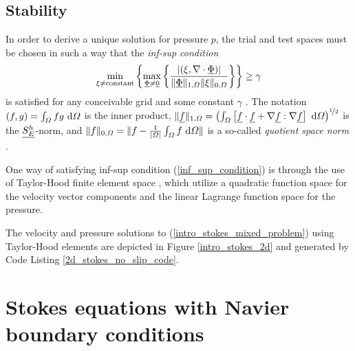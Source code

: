 \subsection{Stability}

In order to derive a unique solution for pressure $p$, the trial and test spaces must be chosen in such a way that the \emph{inf-sup condition}
\begin{align}
  \label{inf_sup_condition}
  \min_{\xi \neq \text{constant}} \left\{ \max_{\underline{\Phi} \neq \underline{0}} \left\{ \frac{\left| \left( \xi, \nabla \cdot \underline{\Phi} \right) \right|}{\Vert \underline{\Phi} \Vert_{1,\varOmega} \Vert \xi \Vert_{0,\varOmega} } \right\} \right\} \geq \gamma
\end{align}
is satisfied for any conceivable grid and some constant $\gamma$ \citep{elman_2005}.  The notation $(f,g) = \int_{\varOmega} f g \ \mathrm{d}\varOmega$ is the inner product, $\Vert \underline{f} \Vert_{1,\varOmega} = \left( \int_{\varOmega} \left[ \underline{f} \cdot \underline{f} + \nabla \underline{f} : \nabla \underline{f} \right] \ \mathrm{d}\varOmega \right)^{\nicefrac{1}{2}}$ is the $\underline{S_E^h}$-norm, and $\Vert f \Vert_{0,\varOmega} = \Vert f - \frac{1}{|\varOmega|} \int_{\varOmega} f \ \mathrm{d}\varOmega \Vert$ is a so-called \emph{quotient space norm} \citep{elman_2005}.

One way of satisfying inf-sup condition (\ref{inf_sup_condition}) is through the use of Taylor-Hood finite element space \citep{taylor_1973}, which utilize a quadratic function space for the velocity vector components and the linear Lagrange function space for the pressure.

The velocity and pressure solutions to (\ref{intro_stokes_mixed_problem}) using Taylor-Hood elements are depicted in Figure \ref{intro_stokes_2d} and generated by Code Listing \ref{2d_stokes_no_slip_code}.

\section{Stokes equations with Navier boundary conditions} \label{ssn_intro_stokes_2d_slip}


